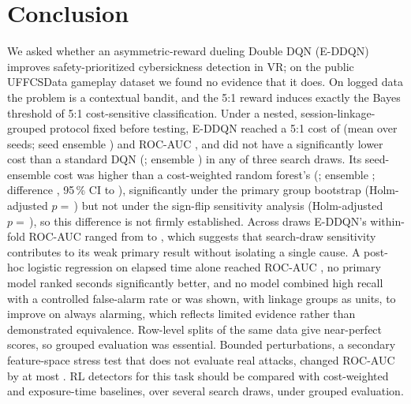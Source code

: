 \section{Conclusion}
\label{sec:conclusion}
We asked whether an asymmetric-reward dueling Double DQN (E-DDQN) improves safety-prioritized cybersickness detection in VR; on the public UFFCSData gameplay dataset we found no evidence that it does. On logged data the problem is a contextual bandit, and the 5:1 reward induces exactly the Bayes threshold of 5:1 cost-sensitive classification. Under a nested, session-linkage-grouped protocol fixed before testing, E-DDQN reached a 5:1 cost of \EDDQNCostCostMean{} (mean over seeds; seed ensemble \PHEnsEDDQNCost) and ROC-AUC \EDDQNCostRocAucMean, and did not have a significantly lower cost than a standard DQN (\DQNCostCostMean; ensemble \PHEnsDQNCost) in any of three search draws. Its seed-ensemble cost was higher than a cost-weighted random forest's (\RFCostCostMean; ensemble \PHEnsRFCost; difference \PairDOneRFCostDiff, 95\,\% CI \PairDOneRFCostLo{} to \PairDOneRFCostHi), significantly under the primary group bootstrap (Holm-adjusted $p=$\,\PHHolmRF) but not under the sign-flip sensitivity analysis (Holm-adjusted $p=$\,\PHSfRFHolm), so this difference is not firmly established. Across draws E-DDQN's within-fold ROC-AUC ranged from \SDEDDQNWfMin{} to \SDEDDQNWfMax, which suggests that search-draw sensitivity contributes to its weak primary result without isolating a single cause. A post-hoc logistic regression on elapsed time alone reached ROC-AUC \PHTimeLRRocAucMean, no primary model ranked seconds significantly better, and no model combined high recall with a controlled false-alarm rate or was shown, with linkage groups as units, to improve on always alarming, which reflects limited evidence rather than demonstrated equivalence. Row-level splits of the same data give near-perfect scores, so grouped evaluation was essential. Bounded perturbations, a secondary feature-space stress test that does not evaluate real attacks, changed ROC-AUC by at most \AttAucMaxAbsChange. RL detectors for this task should be compared with cost-weighted and exposure-time baselines, over several search draws, under grouped evaluation.
